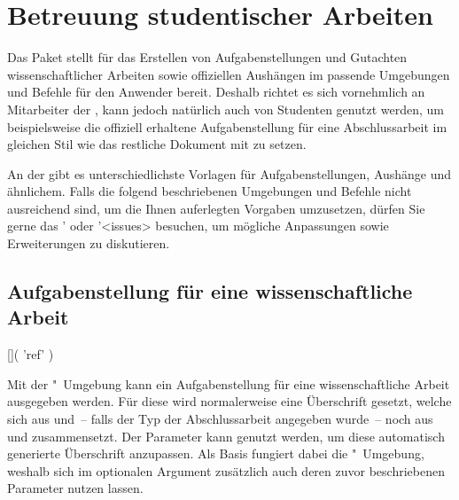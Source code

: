 \chapter[%
  Das Paket \PackageRaw{tudscrsupervisor}{\BooleanFalse}
  -- Studentische Betreuung%
]{%
  Betreuung studentischer Arbeiten%
}
\begin{Entity*}{}
%
Das Paket  stellt für das Erstellen von 
Aufgabenstellungen und Gutachten wissenschaftlicher Arbeiten sowie offiziellen 
Aushängen im \CD passende Umgebungen und Befehle für den Anwender bereit. 
Deshalb richtet es sich vornehmlich an Mitarbeiter der \TnUD, kann jedoch 
natürlich auch von Studenten genutzt werden, um beispielsweise die offiziell 
erhaltene Aufgabenstellung für eine Abschlussarbeit im gleichen Stil wie das 
restliche Dokument mit  zu setzen.

An der \TUD gibt es unterschiedlichste Vorlagen für Aufgabenstellungen, 
Aushänge und ähnlichem. Falls die folgend beschriebenen Umgebungen und Befehle 
nicht ausreichend sind, um die Ihnen auferlegten Vorgaben umzusetzen, dürfen 
Sie gerne das \Forum' oder \GitHubRepo'<issues> besuchen, um mögliche 
Anpassungen sowie Erweiterungen zu diskutieren.



\section{%
  Aufgabenstellung für eine wissenschaftliche Arbeit%
}
\begin{Declaration}{[]}(%
  'ref'%
)
\begin{Declaration}{}
\begin{Declaration}[v2.05]{}
\printdeclarationlist%
%
Mit der "~Umgebung kann ein Aufgabenstellung für eine 
wissenschaftliche Arbeit ausgegeben werden. Für diese wird normalerweise eine 
Überschrift gesetzt, welche sich aus  und~-- falls der Typ der 
Abschlussarbeit angegeben wurde~-- noch aus  und  
zusammensetzt. Der Parameter  kann genutzt 
werden, um diese automatisch generierte Überschrift anzupassen. Als Basis 
fungiert dabei die "~Umgebung, weshalb sich im optionalen 
Argument zusätzlich auch deren zuvor beschriebenen Parameter nutzen lassen.


\end{Declaration}
\end{Declaration}
\end{Declaration}
\end{Entity*}
